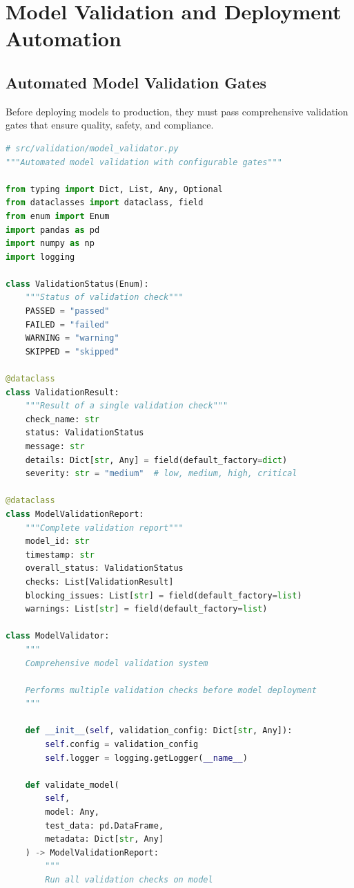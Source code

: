 \section{Model Validation and Deployment Automation}

\subsection{Automated Model Validation Gates}

Before deploying models to production, they must pass comprehensive validation gates that ensure quality, safety, and compliance.

\begin{lstlisting}[language=Python, caption=Automated Model Validation System]
# src/validation/model_validator.py
"""Automated model validation with configurable gates"""

from typing import Dict, List, Any, Optional
from dataclasses import dataclass, field
from enum import Enum
import pandas as pd
import numpy as np
import logging

class ValidationStatus(Enum):
    """Status of validation check"""
    PASSED = "passed"
    FAILED = "failed"
    WARNING = "warning"
    SKIPPED = "skipped"

@dataclass
class ValidationResult:
    """Result of a single validation check"""
    check_name: str
    status: ValidationStatus
    message: str
    details: Dict[str, Any] = field(default_factory=dict)
    severity: str = "medium"  # low, medium, high, critical

@dataclass
class ModelValidationReport:
    """Complete validation report"""
    model_id: str
    timestamp: str
    overall_status: ValidationStatus
    checks: List[ValidationResult]
    blocking_issues: List[str] = field(default_factory=list)
    warnings: List[str] = field(default_factory=list)

class ModelValidator:
    """
    Comprehensive model validation system

    Performs multiple validation checks before model deployment
    """

    def __init__(self, validation_config: Dict[str, Any]):
        self.config = validation_config
        self.logger = logging.getLogger(__name__)

    def validate_model(
        self,
        model: Any,
        test_data: pd.DataFrame,
        metadata: Dict[str, Any]
    ) -> ModelValidationReport:
        """
        Run all validation checks on model


\end{lstlisting}
